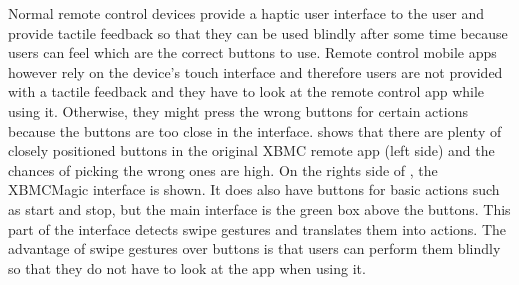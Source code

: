 Normal remote control devices provide a haptic user interface to the user and provide tactile feedback so that they can be used blindly after some time because users can feel which are the correct buttons to use. Remote control mobile apps however rely on the device's touch interface and therefore users are not provided with a tactile feedback and they have to look at the remote control app while using it. Otherwise, they might press the wrong buttons for certain actions because the buttons are too close in the interface.  shows that there are plenty of closely positioned buttons in the original XBMC remote app (left side) and the chances of picking the wrong ones are high. On the rights side of , the XBMCMagic interface is shown. It does also have buttons for basic actions such as start and stop, but the main interface is the green box above the buttons. This part of the interface detects swipe gestures and translates them into actions. The advantage of swipe gestures over buttons is that users can perform them blindly so that they do not have to look at the app when using it.